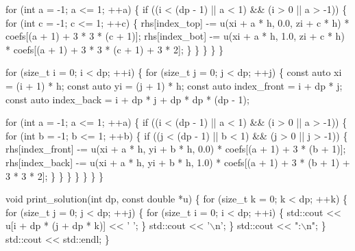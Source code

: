 \begin{DoxyCodeInclude}
            \textcolor{keywordflow}{for} (\textcolor{keywordtype}{int} a = -1; a <= 1; ++a) \{
                \textcolor{keywordflow}{if} ((i < (dp - 1) || a < 1) && (i > 0 || a > -1)) \{
                    \textcolor{keywordflow}{for} (\textcolor{keywordtype}{int} c = -1; c <= 1; ++c) \{
                        rhs[index\_top] -= u(xi + a * h, 0.0, zi + c * h) *
                                          coefs[(a + 1) + 3 * 3 * (c + 1)];
                        rhs[index\_bot] -=
                            u(xi + a * h, 1.0, zi + c * h) *
                            coefs[(a + 1) + 3 * 3 * (c + 1) + 3 * 2];
                    \}
                \}
            \}
        \}
    \}

    \textcolor{keywordflow}{for} (\textcolor{keywordtype}{size\_t} i = 0; i < dp; ++i) \{
        \textcolor{keywordflow}{for} (\textcolor{keywordtype}{size\_t} j = 0; j < dp; ++j) \{
            \textcolor{keyword}{const} \textcolor{keyword}{auto} xi = (i + 1) * h;
            \textcolor{keyword}{const} \textcolor{keyword}{auto} yi = (j + 1) * h;
            \textcolor{keyword}{const} \textcolor{keyword}{auto} index\_front = i + dp * j;
            \textcolor{keyword}{const} \textcolor{keyword}{auto} index\_back = i + dp * j + dp * dp * (dp - 1);

            \textcolor{keywordflow}{for} (\textcolor{keywordtype}{int} a = -1; a <= 1; ++a) \{
                \textcolor{keywordflow}{if} ((i < (dp - 1) || a < 1) && (i > 0 || a > -1)) \{
                    \textcolor{keywordflow}{for} (\textcolor{keywordtype}{int} b = -1; b <= 1; ++b) \{
                        \textcolor{keywordflow}{if} ((j < (dp - 1) || b < 1) && (j > 0 || j > -1)) \{
                            rhs[index\_front] -= u(xi + a * h, yi + b * h, 0.0) *
                                                coefs[(a + 1) + 3 * (b + 1)];
                            rhs[index\_back] -=
                                u(xi + a * h, yi + b * h, 1.0) *
                                coefs[(a + 1) + 3 * (b + 1) + 3 * 3 * 2];
                        \}
                    \}
                \}
            \}
        \}
    \}
\}


\textcolor{keywordtype}{void} print\_solution(\textcolor{keywordtype}{int} dp, \textcolor{keyword}{const} \textcolor{keywordtype}{double} *u)
\{
    \textcolor{keywordflow}{for} (\textcolor{keywordtype}{size\_t} k = 0; k < dp; ++k) \{
        \textcolor{keywordflow}{for} (\textcolor{keywordtype}{size\_t} j = 0; j < dp; ++j) \{
            \textcolor{keywordflow}{for} (\textcolor{keywordtype}{size\_t} i = 0; i < dp; ++i) \{
                std::cout << u[i + dp * (j + dp * k)] << \textcolor{charliteral}{' '};
            \}
            std::cout << \textcolor{charliteral}{'\(\backslash\)n'};
        \}
        std::cout << \textcolor{stringliteral}{":\(\backslash\)n"};
    \}
    std::cout << std::endl;
\}



\end{DoxyCodeInclude}

